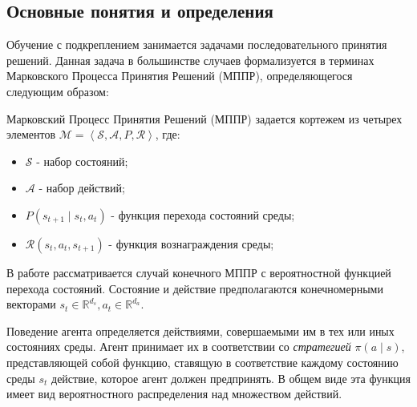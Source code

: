 \subsection{Основные понятия и определения}
Обучение с подкреплением занимается задачами последовательного принятия решений. 
Данная задача в большинстве случаев формализуется в терминах Марковского Процесса Принятия Решений (МППР), определяющегося следующим образом:
\begin{Def}
    Марковский Процесс Принятия Решений (МППР) задается кортежем из четырех элементов $\mathcal{M} = \left<\mathcal{S}, \mathcal{A}, P, \mathcal{R}\right>$, где:
    \begin{itemize}
        \item $\mathcal{S}$ - набор состояний;
        \item $\mathcal{A}$ - набор действий;
        \item $P(s_{t+1}\mid s_t, a_t)$ - функция перехода состояний среды;
        \item $\mathcal{R}(s_t, a_t, s_{t+1})$ - функция вознаграждения среды;
    \end{itemize}
    \label{mdp}
\end{Def}
В работе рассматривается случай конечного МППР с вероятностной функцией перехода состояний. 
Состояние и действие предполагаются конечномерными векторами $s_t \in \mathbb{R}^{d_{s}}, a_t \in \mathbb{R}^{d_{a}}$.

Поведение агента определяется действиями, совершаемыми им в тех или иных состояниях среды. 
Агент принимает их в соответствии со \textit{стратегией} $\pi (a \mid s)$, представляющей собой функцию, ставящую в соответствие каждому состоянию среды $s_t$ действие, которое агент должен предпринять. 
В общем виде эта функция имеет вид вероятностного распределения над множеством действий.

